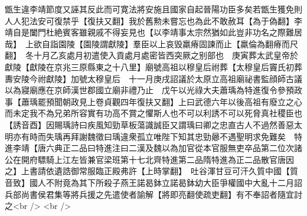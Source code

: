 甑生違李靖節度又誣其反此而可寛法將安施且國家自起晉陽功臣多矣若甑生獲免則人人犯法安可復禁乎【復扶又翻】我於舊勲未嘗忘也為此不敢赦耳【為于偽翻】李靖自是闔門杜絶賓客雖親戚不得妄見也【以李靖事太宗然猶如此豈非功名之際難居哉】　上欲自詣園陵【園陵謂獻陵】羣臣以上哀毁羸瘠固諫而止【羸倫為翻瘠而尺翻】　冬十月乙亥處月初遣使入貢處月處密皆西突厥之别部也　庚寅葬太武皇帝於獻陵【獻陵在京兆三原縣東之十八里】廟號高祖以穆皇后祔葬【太穆皇后竇氏初葬夀安陵今祔獻陵】加號太穆皇后　十一月庚戌詔議於太原立高祖廟祕書監顔師古議以為寢廟應在京師漢世郡國立廟非禮乃止　戊午以光祿大夫蕭瑀為特進復令參預政事【蕭瑀罷預聞朝政見上卷貞觀四年復扶又翻】上曰武德六年以後高祖有廢立之心而未定我不為兄弟所容實有功高不賞之懼斯人也不可以利誘不可以死脅真社稷臣也【誘音酉】因賜瑀詩曰疾風知勁草板蕩識誠臣又謂瑀曰卿之忠直古人不過然善惡太明亦有時而失瑀再拜謝魏徵曰瑀違衆孤立唯陛下知其忠勁曏不遇聖明求免難矣　特進李靖【唐六典正二品曰特進注曰二漢及魏以為加官從本官服無吏卒品第二位次諸公在開府驃騎上江左皆兼官梁班第十七北齊特進第二品隋特進為正二品散官唐因之】上書請依遺誥御常服臨正殿弗許【上時掌翻】　吐谷渾甘豆可汗久質中國【質音致】國人不附竟為其下所殺子燕王諾曷鉢立諾曷鉢幼大臣爭權國中大亂十二月詔兵部尚書侯君集等將兵援之先遣使者諭解【將即亮翻使疏吏翻】有不奉詔者隨宜討之<br />
<br />
